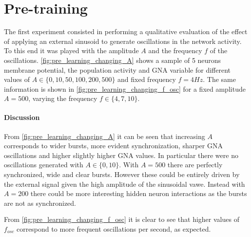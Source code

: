 \documentclass[10pt,a4paper, final]{report} %
\begin{document}
\section{Pre-training}
The first experiment consisted in performing a qualitative evaluation of the effect of applying an  external sinusoid to generate oscillations in the network activity. To this end it was played with the amplitude $A$ and the frequency $f$ of the oscillations. \autoref{fig:pre_learning_changing_A} shows a sample of 5 neurons membrane potential, the population activity and GNA variable for different values of $A \in \{0, 10, 50, 100, 200, 500 \}$ and fixed frequency $f=4 Hz$.  
The same information is shown in \autoref{fig:pre_learning_changing_f_osc} for a fixed amplitude $A=500$, varying the frequency $f \in \{4,7,10 \}$.

\paragraph{Discussion}
From \autoref{fig:pre_learning_changing_A} it can be seen that increasing $A$ corresponds to wider bursts, more evident synchronization, sharper GNA oscillations and higher slightly higher GNA values. In particular there were no oscillations generated with $A \in \{0, 10\}$. With $A=500$ there are perfectly synchronized, wide and clear bursts. However these could be entirely driven by the external signal given the high amplitude of the sinusoidal vawe. Instead with $A=200$ there could be more interesting hidden neuron interactions as the bursts are not as synchronized.

From \autoref{fig:pre_learning_changing_f_osc} it is clear to see that higher values of $f_{osc}$ correspond to more frequent oscillations per second, as expected.
\end{document}
